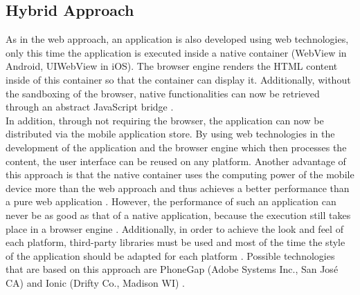\documentclass[Bachelor,BIF,english]{twbook}
\begin{document}
\subsection{Hybrid Approach}
As in the web approach, an application is also developed using web technologies, only this time the application is executed inside a native container (WebView in Android, UIWebView in iOS). The browser engine renders the HTML content inside of this container so that the container can display it. Additionally, without the sandboxing of the browser, native functionalities can now be retrieved through an abstract JavaScript bridge \cite[p.~626]{6420693} \cite[p.~2]{7479278}. 
\\[\baselineskip]
In addition, through not requiring the browser, the application can now be distributed via the mobile application store. By using web technologies in the development of the application and the browser engine which then processes the content, the user interface can be reused on any platform. Another advantage of this approach is that the native container uses the computing power of the mobile device more than the web approach and thus achieves a better performance than a pure web application \cite[p.~626]{6420693}. However, the performance of such an application can never be as good as that of a native application, because the execution still takes place in a browser engine \cite[p.~2]{7479278}. Additionally, in order to achieve the look and feel of each platform, third-party libraries must be used and most of the time the style of the application should be adapted for each platform \cite[p.~627]{6420693}. Possible technologies that are based on this approach are PhoneGap (Adobe Systems Inc., San José CA) and Ionic (Drifty Co., Madison WI) \cite[p.~2]{7934674}.
\end{document}
